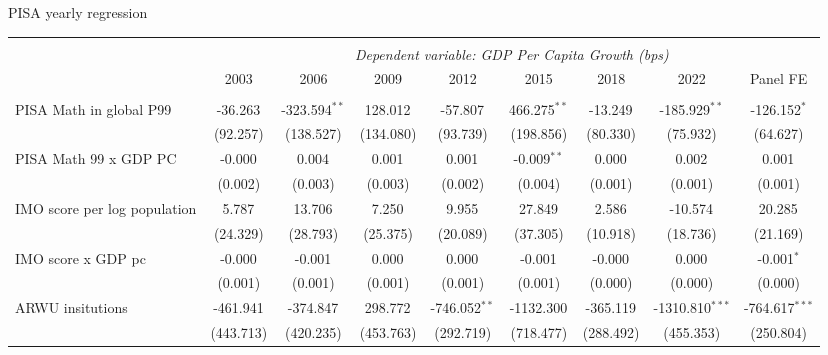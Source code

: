 \documentclass[10pt]{beamer}
\begin{document}
\begin{frame}{PISA yearly regression}
    \begin{table}[!htbp] \centering
        \resizebox{\linewidth}{!} {
            \begin{tabular}{@{\extracolsep{1pt}}lcccccccc}
                \\[-1.8ex]\hline
                \hline \\[-1.8ex]
                & \multicolumn{8}{c}{\textit{Dependent variable: GDP Per Capita Growth (bps)}} \
                \cr \cline{2-9}
                \\[-1.8ex] & \multicolumn{1}{c}{2003} & \multicolumn{1}{c}{2006} & \multicolumn{1}{c}{2009} & \multicolumn{1}{c}{2012} & \multicolumn{1}{c}{2015} & \multicolumn{1}{c}{2018} & \multicolumn{1}{c}{2022} & \multicolumn{1}{c}{Panel FE}  \\
                \hline \\[-1.8ex]
                 PISA Math in global P99 & -36.263$^{}$ & -323.594$^{**}$ & 128.012$^{}$ & -57.807$^{}$ & 466.275$^{**}$ & -13.249$^{}$ & -185.929$^{**}$ & -126.152$^{*}$ \\
                & (92.257) & (138.527) & (134.080) & (93.739) & (198.856) & (80.330) & (75.932) & (64.627) \\
                 PISA Math 99 x GDP PC & -0.000$^{}$ & 0.004$^{}$ & 0.001$^{}$ & 0.001$^{}$ & -0.009$^{**}$ & 0.000$^{}$ & 0.002$^{}$ & 0.001$^{}$ \\
                & (0.002) & (0.003) & (0.003) & (0.002) & (0.004) & (0.001) & (0.001) & (0.001) \\
                 IMO score per log population & 5.787$^{}$ & 13.706$^{}$ & 7.250$^{}$ & 9.955$^{}$ & 27.849$^{}$ & 2.586$^{}$ & -10.574$^{}$ & 20.285$^{}$ \\
                & (24.329) & (28.793) & (25.375) & (20.089) & (37.305) & (10.918) & (18.736) & (21.169) \\
                 IMO score x GDP pc & -0.000$^{}$ & -0.001$^{}$ & 0.000$^{}$ & 0.000$^{}$ & -0.001$^{}$ & -0.000$^{}$ & 0.000$^{}$ & -0.001$^{*}$ \\
                & (0.001) & (0.001) & (0.001) & (0.001) & (0.001) & (0.000) & (0.000) & (0.000) \\
                 ARWU insitutions & -461.941$^{}$ & -374.847$^{}$ & 298.772$^{}$ & -746.052$^{**}$ & -1132.300$^{}$ & -365.119$^{}$ & -1310.810$^{***}$ & -764.617$^{***}$ \\
                & (443.713) & (420.235) & (453.763) & (292.719) & (718.477) & (288.492) & (455.353) & (250.804) \\

\end{tabular}}
\end{table}
\end{frame}
\end{document}
